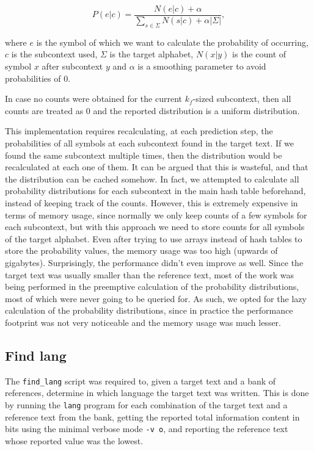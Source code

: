 \documentclass{article}
\begin{document}
$$
P(e|c) = \frac{N(e|c) + \alpha}{\sum_{s \in \Sigma}{N(s|c)} + \alpha |\Sigma|},
$$

where $e$ is the symbol of which we want to calculate the probability of occurring, $c$ is the subcontext used, $\Sigma$ is the target alphabet, $N(x|y)$ is the count of symbol $x$ after subcontext $y$ and $\alpha$ is a smoothing parameter to avoid probabilities of 0.

In case no counts were obtained for the current $k_f$-sized subcontext, then all counts are treated as 0 and the reported distribution is a uniform distribution.

This implementation requires recalculating, at each prediction step, the probabilities of all symbols at each subcontext found in the target text.
If we found the same subcontext multiple times, then the distribution would be recalculated at each one of them.
It can be argued that this is wasteful, and that the distribution can be cached somehow.
In fact, we attempted to calculate all probability distributions for each subcontext in the main hash table beforehand, instead of keeping track of the counts.
However, this is extremely expensive in terms of memory usage, since normally we only keep counts of a few symbols for each subcontext, but with this approach we need to store counts for all symbols of the target alphabet.
Even after trying to use arrays instead of hash tables to store the probability values, the memory usage was too high (upwards of gigabytes).
Surprisingly, the performance didn't even improve as well.
Since the target text was usually smaller than the reference text, most of the work was being performed in the preemptive calculation of the probability distributions, most of which were never going to be queried for.
As such, we opted for the lazy calculation of the probability distributions, since in practice the performance footprint was not very noticeable and the memory usage was much lesser.

\subsection{Find lang}
\label{subsec:methodology_find_lang}

The \texttt{find_lang} script was required to, given a target text and a bank of references, determine in which language the target text was written.
This is done by running the \texttt{lang} program for each combination of the target text and a reference text from the bank, getting the reported total information content in bits using the minimal verbose mode \texttt{-v o}, and reporting the reference text whose reported value was the lowest.
\end{document}
